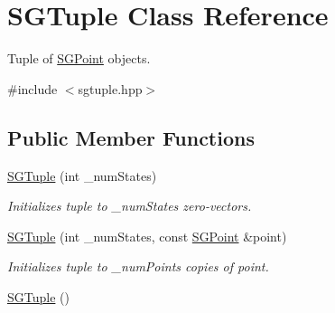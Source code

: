 \hypertarget{class_s_g_tuple}{\section{S\+G\+Tuple Class Reference}
\label{class_s_g_tuple}
}


Tuple of \hyperlink{class_s_g_point}{S\+G\+Point} objects.  




{\ttfamily \#include $<$sgtuple.\+hpp$>$}

\subsection*{Public Member Functions}
\begin{DoxyCompactItemize}
\item 
\hypertarget{class_s_g_tuple_a910db22a259e6f53611f40ac9aac7b33}{\hyperlink{class_s_g_tuple_a910db22a259e6f53611f40ac9aac7b33}{S\+G\+Tuple} (int \+\_\+num\+States)}\label{class_s_g_tuple_a910db22a259e6f53611f40ac9aac7b33}

\begin{DoxyCompactList}\small\item\em Initializes tuple to \+\_\+num\+States zero-\/vectors. \end{DoxyCompactList}\item 
\hypertarget{class_s_g_tuple_a37adecb17ef12a7c1a4cb14bb89ce59f}{\hyperlink{class_s_g_tuple_a37adecb17ef12a7c1a4cb14bb89ce59f}{S\+G\+Tuple} (int \+\_\+num\+States, const \hyperlink{class_s_g_point}{S\+G\+Point} \&point)}\label{class_s_g_tuple_a37adecb17ef12a7c1a4cb14bb89ce59f}

\begin{DoxyCompactList}\small\item\em Initializes tuple to \+\_\+num\+Points copies of point. \end{DoxyCompactList}\item 
\hypertarget{class_s_g_tuple_a1aacff0823f75661729104f8d232fcbf}{\hyperlink{class_s_g_tuple_a1aacff0823f75661729104f8d232fcbf}{S\+G\+Tuple} ()}\label{class_s_g_tuple_a1aacff0823f75661729104f8d232fcbf}


\end{DoxyCompactItemize}
